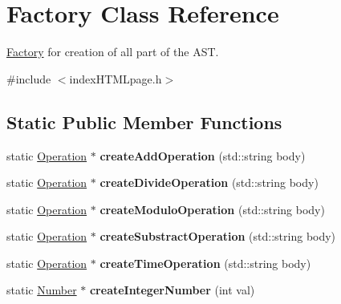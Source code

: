 \hypertarget{class_factory}{\section{Factory Class Reference}
\label{class_factory}
}


\hyperlink{class_factory}{Factory} for creation of all part of the A\-S\-T.  




{\ttfamily \#include $<$index\-H\-T\-M\-Lpage.\-h$>$}

\subsection*{Static Public Member Functions}
\begin{DoxyCompactItemize}
\item 
\hypertarget{class_factory_aab7c0825e04728bfa9b515a6ddd6e48f}{static \hyperlink{class_operation}{Operation} $\ast$ {\bfseries create\-Add\-Operation} (std\-::string body)}\label{class_factory_aab7c0825e04728bfa9b515a6ddd6e48f}

\item 
\hypertarget{class_factory_aa75e36275f769c48e55ef0740af5ddbc}{static \hyperlink{class_operation}{Operation} $\ast$ {\bfseries create\-Divide\-Operation} (std\-::string body)}\label{class_factory_aa75e36275f769c48e55ef0740af5ddbc}

\item 
\hypertarget{class_factory_afb9cf1ac84a9275ce0d3d68cae883266}{static \hyperlink{class_operation}{Operation} $\ast$ {\bfseries create\-Modulo\-Operation} (std\-::string body)}\label{class_factory_afb9cf1ac84a9275ce0d3d68cae883266}

\item 
\hypertarget{class_factory_a4061f85223d97fc151ec35b8644eae3a}{static \hyperlink{class_operation}{Operation} $\ast$ {\bfseries create\-Substract\-Operation} (std\-::string body)}\label{class_factory_a4061f85223d97fc151ec35b8644eae3a}

\item 
\hypertarget{class_factory_ac80521d608a2c985391558c781aba2e4}{static \hyperlink{class_operation}{Operation} $\ast$ {\bfseries create\-Time\-Operation} (std\-::string body)}\label{class_factory_ac80521d608a2c985391558c781aba2e4}

\item 
\hypertarget{class_factory_a4a66797d735b0b0d9e37fee865fe6f43}{static \hyperlink{class_number}{Number} $\ast$ {\bfseries create\-Integer\-Number} (int val)}\label{class_factory_a4a66797d735b0b0d9e37fee865fe6f43}


\end{DoxyCompactItemize}
